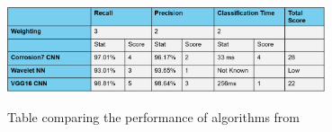 \documentclass[11pt]{article}		%
\newcommand{\supercite}[1]{\textsuperscript{\cite{#1}}}		%
\begin{document}
			\begin{table}[h]
				\centering
				\includegraphics[width=0.7\textwidth]{CNN_corrosion_table}
				\caption{Table comparing the performance of algorithms from \cite{Corrosion7}}
				\label{CNN_comparison}
			\end{table}
	        
\end{document}

